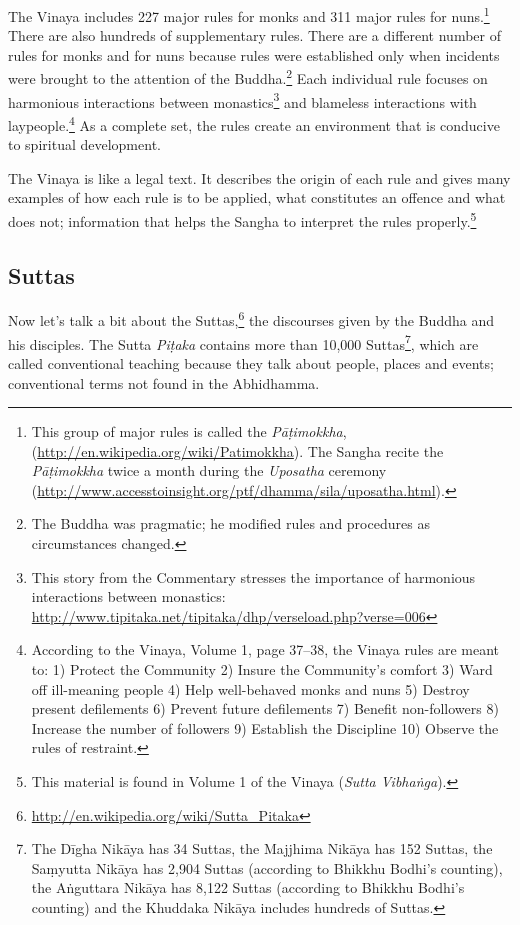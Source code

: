 The Vinaya includes 227 major rules for monks and 311 major rules for nuns.\footnote{This group of major rules is called the \textit{Pāṭimokkha}, (\url{http://en.wikipedia.org/wiki/Patimokkha}). The Sangha recite the \textit{Pāṭimokkha} twice a month during the \textit{Uposatha} ceremony (\url{http://www.accesstoinsight.org/ptf/dhamma/sila/uposatha.html}).} There are also hundreds of supplementary rules. There are a different number of rules for monks and for nuns because rules were established only when incidents were brought to the attention of the Buddha.\footnote{The Buddha was pragmatic; he modified rules and procedures as circumstances changed.} Each individual rule focuses on harmonious interactions between monastics\footnote{This story from the Commentary stresses the importance of harmonious interactions between monastics: \url{http://www.tipitaka.net/tipitaka/dhp/verseload.php?verse=006}} and blameless interactions with laypeople.\footnote{According to the Vinaya, Volume 1, page 37--38, the Vinaya rules are meant to: 1) Protect the Community 2) Insure the Community’s comfort 3) Ward off ill-meaning people 4) Help well-behaved monks and nuns 5) Destroy present defilements 6) Prevent future defilements 7) Benefit non-followers 8) Increase the number of followers 9) Establish the Discipline 10) Observe the rules of restraint.} As a complete set, the rules create an environment that is conducive to spiritual development.

The Vinaya is like a legal text. It describes the origin of each rule and gives many examples of how each rule is to be applied, what constitutes an offence and what does not; information that helps the Sangha to interpret the rules properly.\footnote{This material is found in Volume 1 of the Vinaya (\textit{Sutta Vibhaṅga}).}

\subsection*{Suttas}

Now let’s talk a bit about the Suttas,\footnote{\url{http://en.wikipedia.org/wiki/Sutta_Pitaka}} the discourses given by the Buddha and his disciples. The Sutta \textit{Piṭaka} contains more than 10,000 Suttas\footnote{The Dīgha Nikāya has 34 Suttas, the Majjhima Nikāya has 152 Suttas, the Saṃyutta Nikāya has 2,904 Suttas (according to Bhikkhu Bodhi’s counting), the Aṅguttara Nikāya has 8,122 Suttas (according to Bhikkhu Bodhi’s counting) and the Khuddaka Nikāya includes hundreds of Suttas.}, which are called conventional teaching because they talk about people, places and events; conventional terms not found in the Abhidhamma.


